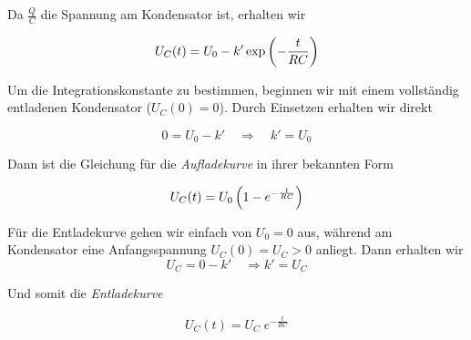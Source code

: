 \documentclass[a4paper,german,12pt,smallheadings]{scrartcl}
\begin{document}
Da $\frac{Q}{C}$ die Spannung am Kondensator ist, erhalten wir

\begin{equation}
  U_C(t) = U_0 - k' \exp \del{-\frac{t}{RC}}
\end{equation}

Um die Integrationskonstante zu bestimmen, beginnen wir mit einem vollständig
entladenen Kondensator ($U_C(0) = 0$). Durch Einsetzen erhalten wir direkt

\begin{equation}
  0 = U_0 - k' \quad \Rightarrow \quad k' = U_0
\end{equation}

Dann ist die Gleichung für die \textit{Aufladekurve} in ihrer bekannten Form

\begin{equation}
  U_C(t) = U_0 \del{1 - e^{-\frac{t}{RC}}}
\end{equation}

Für die Entladekurve gehen wir einfach von $U_0 = 0$ aus, während am
Kondensator eine Anfangsspannung $U_C(0) = U_C > 0$ anliegt. Dann erhalten wir
\begin{equation}
  U_C = 0 - k' \quad \Rightarrow k' = U_C
\end{equation}

Und somit die \textit{Entladekurve}

\begin{equation}
  U_C(t) = U_C \; e^{-\frac{t}{RC}}
\end{equation}

\end{document}
